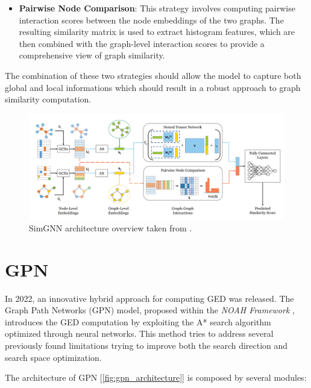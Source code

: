 \documentclass[../Thesis.tex]{subfiles}
\begin{document}
	\begin{itemize}
		\item \textbf{Pairwise Node Comparison}: This strategy involves computing pairwise interaction scores between the node embeddings of the two graphs. The resulting similarity matrix is used to extract histogram features, which are then combined with the graph-level interaction scores to provide a comprehensive view of graph similarity.
	\end{itemize}
	
	The combination of these two strategies should allow the model to capture both global and local informations which should result in a robust approach to graph similarity computation.
	
	\begin{figure}[H]
		\centering
		\includegraphics[width=\textwidth]{Images/simgnn_architecture.png}
		\caption{SimGNN architecture overview taken from \cite{simgnn__a_neural_network_approach_to_fast_graph_similarity_computation}.}
		\label{fig:simgnn_architecture}
	\end{figure}

	
	\section{GPN}
	\label{sec:gpn}
	
	In 2022, an innovative hybrid approach for computing GED was released.
	The Graph Path Networks (GPN) model, proposed within the \textit{NOAH Framework} \cite{noah__neural_optimized_a*_search_algorithm_for_graph_edit_distance_computation}, introduces the GED computation by exploiting the A* search algorithm optimized through neural networks. This method tries to address several previously found limitations trying to improve both the search direction and search space optimization.
	
	The architecture of GPN [\autoref{fig:gpn_architecture}] is composed by several modules:
	
\end{document}
